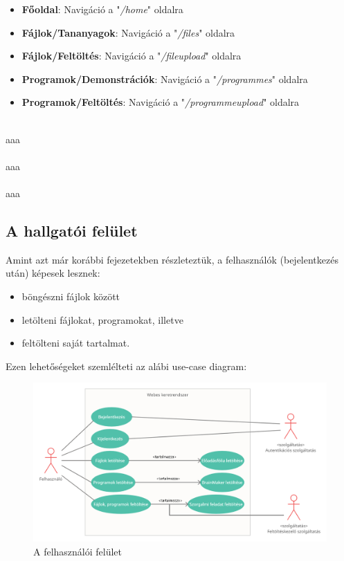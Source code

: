 \begin{itemize}
\item{\textbf{Főoldal}: Navigáció a "\textit{/home}" oldalra}
\item{\textbf{Fájlok/Tananyagok}: Navigáció a "\textit{/files}" oldalra}
\item{\textbf{Fájlok/Feltöltés}: Navigáció a "\textit{/fileupload}" oldalra}
\item{\textbf{Programok/Demonstrációk}: Navigáció a "\textit{/programmes}" oldalra}
\item{\textbf{Programok/Feltöltés}: Navigáció a "\textit{/programmeupload}" oldalra}
\end{itemize}

\\

aaa\\

\\

aaa\\

\\

aaa


\subsection{A hallgatói felület}

Amint azt már korábbi fejezetekben részleteztük, a felhasználók (bejelentkezés után) képesek lesznek:

\begin{itemize}
\item{böngészni fájlok között}
\item{letölteni fájlokat, programokat, illetve}
\item{feltölteni saját tartalmat.}
\end{itemize}

Ezen lehetőségeket szemlélteti az alábi use-case diagram:

\begin{figure}[h]
	\centering
		\includegraphics[width=10truecm, height=7truecm]{images/felhasznalo_use_case.png}
	\caption{A felhasználói felület}
	\label{fig:login}
\end{figure}

